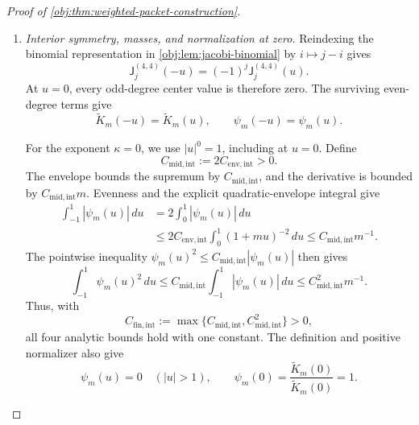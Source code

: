 \begin{proof}[Proof of \cref{obj:thm:weighted-packet-construction}]
\begin{enumerate}
On the whole line,
\[
\psi_m(u)
=
\mathcal T(u)\frac{\widetilde K_m(u)}{\widetilde K_m(0)}.
\]
The previously established regularity of \(\mathcal T\) proves that this packet is continuously differentiable. Its derivative vanishes outside \([-1,1]\), and continuity extends the bound to the two endpoints.

Set
\[
C_{\mathrm{env,int}}
:=
\frac{C_{\mathrm{loc},2}^{4,4}
      +8C_{\mathrm{loc},1}^{4,4}
      +C_{\mathrm{lip},1}^{4,4}}{c_{\mathrm{int}}}>0.
\]
We have proved, for every real \(u\),
\[
|\psi_m(u)|\le C_{\mathrm{env,int}}(1+m|u|)^{-2},
\qquad
|\psi_m'(u)|\le C_{\mathrm{env,int}}m.
\]

\item \emph{Interior symmetry, masses, and normalization at zero.}
Reindexing the binomial representation in \cref{obj:lem:jacobi-binomial} by \(i\mapsto j-i\) gives
\[
\mathsf J_j^{(4,4)}(-u)
=(-1)^j\mathsf J_j^{(4,4)}(u).
\]
At \(u=0\), every odd-degree center value is therefore zero. The surviving even-degree terms give
\[
\widetilde K_m(-u)=\widetilde K_m(u),
\qquad
\psi_m(-u)=\psi_m(u).
\]

For the exponent \(\kappa=0\), we use \(|u|^0=1\), including at \(u=0\). Define
\[
C_{\mathrm{mid,int}}:=2C_{\mathrm{env,int}}>0.
\]
The envelope bounds the supremum by \(C_{\mathrm{mid,int}}\), and the derivative is bounded by \(C_{\mathrm{mid,int}}m\). Evenness and the explicit quadratic-envelope integral give
\[
\begin{split}
\int_{-1}^1|\psi_m(u)|\,du
&=
2\int_0^1|\psi_m(u)|\,du\\
&\le
2C_{\mathrm{env,int}}\int_0^1(1+mu)^{-2}\,du
\le C_{\mathrm{mid,int}}m^{-1}.
\end{split}
\]
The pointwise inequality
\(\psi_m(u)^2\le C_{\mathrm{mid,int}}|\psi_m(u)|\) then gives
\[
\int_{-1}^1\psi_m(u)^2\,du
\le
C_{\mathrm{mid,int}}\int_{-1}^1|\psi_m(u)|\,du
\le C_{\mathrm{mid,int}}^2m^{-1}.
\]
Thus, with
\[
C_{\mathrm{fin,int}}
:=
\max\{C_{\mathrm{mid,int}},C_{\mathrm{mid,int}}^2\}>0,
\]
all four analytic bounds hold with one constant. The definition and positive normalizer also give
\[
\psi_m(u)=0\quad(|u|>1),
\qquad
\psi_m(0)=\frac{\widetilde K_m(0)}{\widetilde K_m(0)}=1.
\]


\end{enumerate}
\end{proof}
